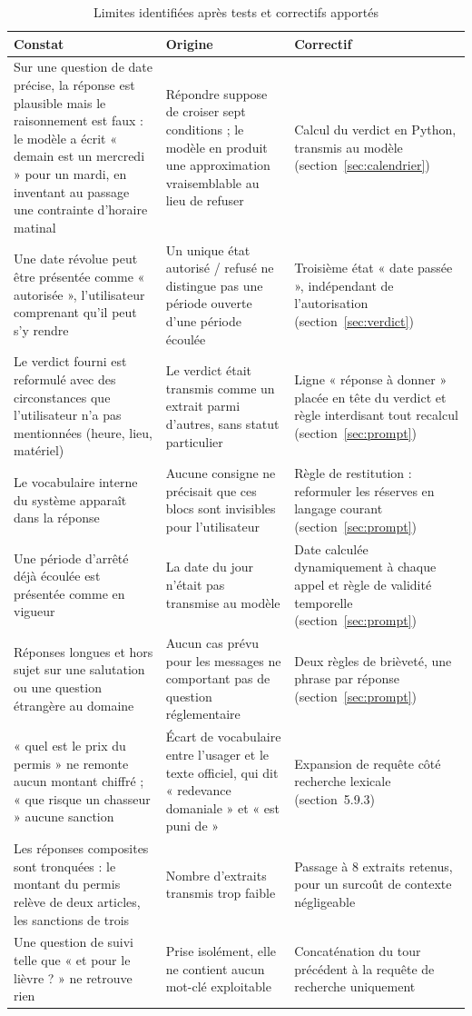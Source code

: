 \begin{table}[h]
\centering
\caption{Limites identifiées après tests et correctifs apportés}
\label{tab:lacunes}
\begin{tabular}{|p{4.5cm}|p{4.2cm}|p{4.6cm}|}
\hline
\textbf{Constat} & \textbf{Origine} & \textbf{Correctif} \\
\hline
Sur une question de date précise, la réponse est plausible mais le
raisonnement est faux : le modèle a écrit « demain est un mercredi » pour un
mardi, en inventant au passage une contrainte d'horaire matinal
& Répondre suppose de croiser sept conditions ; le modèle en produit une
approximation vraisemblable au lieu de refuser
& Calcul du verdict en Python, transmis au modèle
(section~\ref{sec:calendrier}) \\
\hline
Une date révolue peut être présentée comme « autorisée », l'utilisateur
comprenant qu'il peut s'y rendre
& Un unique état autorisé / refusé ne distingue pas une période ouverte d'une
période écoulée
& Troisième état « date passée », indépendant de l'autorisation
(section~\ref{sec:verdict}) \\
\hline
Le verdict fourni est reformulé avec des circonstances que l'utilisateur n'a
pas mentionnées (heure, lieu, matériel)
& Le verdict était transmis comme un extrait parmi d'autres, sans statut
particulier
& Ligne « réponse à donner » placée en tête du verdict et règle interdisant
tout recalcul (section~\ref{sec:prompt}) \\
\hline
Le vocabulaire interne du système apparaît dans la réponse
& Aucune consigne ne précisait que ces blocs sont invisibles pour
l'utilisateur
& Règle de restitution : reformuler les réserves en langage courant
(section~\ref{sec:prompt}) \\
\hline
Une période d'arrêté déjà écoulée est présentée comme en vigueur
& La date du jour n'était pas transmise au modèle
& Date calculée dynamiquement à chaque appel et règle de validité temporelle
(section~\ref{sec:prompt}) \\
\hline
Réponses longues et hors sujet sur une salutation ou une question étrangère
au domaine
& Aucun cas prévu pour les messages ne comportant pas de question
réglementaire
& Deux règles de brièveté, une phrase par réponse
(section~\ref{sec:prompt}) \\
\hline
« quel est le prix du permis » ne remonte aucun montant chiffré ; « que
risque un chasseur » aucune sanction
& Écart de vocabulaire entre l'usager et le texte officiel, qui dit
« redevance domaniale » et « est puni de »
& Expansion de requête côté recherche lexicale (section~5.9.3) \\
\hline
Les réponses composites sont tronquées : le montant du permis relève de deux
articles, les sanctions de trois
& Nombre d'extraits transmis trop faible
& Passage à 8 extraits retenus, pour un surcoût de contexte négligeable \\
\hline
Une question de suivi telle que « et pour le lièvre ? » ne retrouve rien
& Prise isolément, elle ne contient aucun mot-clé exploitable
& Concaténation du tour précédent à la requête de recherche uniquement \\
\hline
\end{tabular}
\end{table}

